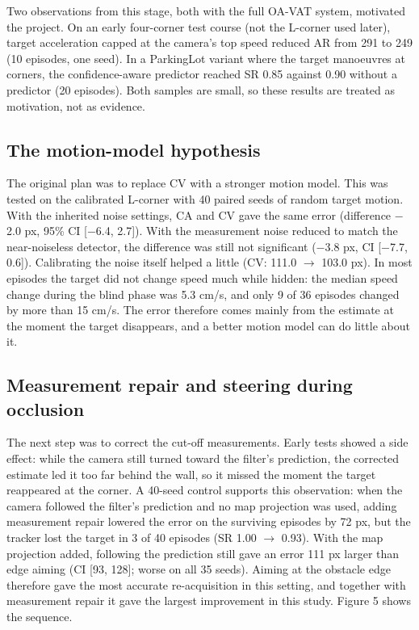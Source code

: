 \documentclass[12pt,a4paper]{article}
\begin{document}
Two observations from this stage, both with the full OA-VAT system, motivated the project. On an early four-corner test course (not the L-corner used later), target acceleration capped at the camera’s top speed reduced AR from 291 to 249 (10 episodes, one seed). In a ParkingLot variant where the target manoeuvres at corners, the confidence-aware predictor reached SR 0.85 against 0.90 without a predictor (20 episodes). Both samples are small, so these results are treated as motivation, not as evidence.

\subsection{The motion-model hypothesis}
The original plan was to replace CV with a stronger motion model. This was tested on the calibrated L-corner with 40 paired seeds of random target motion. With the inherited noise settings, CA and CV gave the same error (difference $-$2.0 px, 95\% CI [$-$6.4, 2.7]). With the measurement noise reduced to match the near-noiseless detector, the difference was still not significant ($-$3.8 px, CI [$-$7.7, 0.6]). Calibrating the noise itself helped a little (CV: 111.0 $\rightarrow$ 103.0 px). In most episodes the target did not change speed much while hidden: the median speed change during the blind phase was 5.3 cm/s, and only 9 of 36 episodes changed by more than 15 cm/s. The error therefore comes mainly from the estimate at the moment the target disappears, and a better motion model can do little about it.

\subsection{Measurement repair and steering during occlusion}
The next step was to correct the cut-off measurements. Early tests showed a side effect: while the camera still turned toward the filter's prediction, the corrected estimate led it too far behind the wall, so it missed the moment the target reappeared at the corner.
A 40-seed control supports this observation: when the camera followed the filter's prediction and no map projection was used, adding measurement repair lowered the error on the surviving episodes by 72 px, but the tracker lost the target in 3 of 40 episodes (SR 1.00 $\rightarrow$ 0.93).
With the map projection added, following the prediction still gave an error 111 px larger than edge aiming (CI [93, 128]; worse on all 35 seeds).
Aiming at the obstacle edge therefore gave the most accurate re-acquisition in this setting, and together with measurement repair it gave the largest improvement in this study. Figure 5 shows the sequence.
\end{document}
